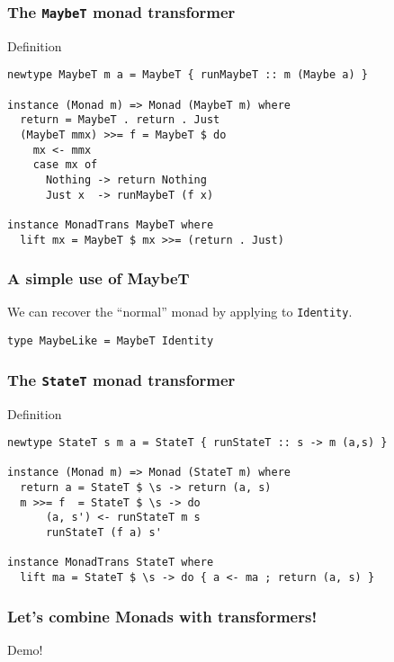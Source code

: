 \documentclass[pdftex,aspectratio=169]{beamer}
\begin{document}
\begin{frame}[fragile]
  \frametitle{The \texttt{MaybeT} monad transformer}
  \begin{block}{Definition}
\begin{lstlisting}
newtype MaybeT m a = MaybeT { runMaybeT :: m (Maybe a) }

instance (Monad m) => Monad (MaybeT m) where
  return = MaybeT . return . Just
  (MaybeT mmx) >>= f = MaybeT $ do
    mx <- mmx
    case mx of
      Nothing -> return Nothing
      Just x  -> runMaybeT (f x)

instance MonadTrans MaybeT where
  lift mx = MaybeT $ mx >>= (return . Just)
\end{lstlisting}
  \end{block}
\end{frame}

\begin{frame}[fragile]
  \frametitle{A simple use of MaybeT}
  We can recover the ``normal'' monad by applying to \lstinline{Identity}.
  \begin{block}{}
  \begin{lstlisting}
type MaybeLike = MaybeT Identity
  \end{lstlisting}
\end{block}
\end{frame}


\begin{frame}[fragile]
  \frametitle{The \texttt{StateT} monad transformer}
  \begin{block}{Definition}
\begin{lstlisting}
newtype StateT s m a = StateT { runStateT :: s -> m (a,s) }

instance (Monad m) => Monad (StateT m) where
  return a = StateT $ \s -> return (a, s)
  m >>= f  = StateT $ \s -> do
      (a, s') <- runStateT m s
      runStateT (f a) s'

instance MonadTrans StateT where
  lift ma = StateT $ \s -> do { a <- ma ; return (a, s) }
\end{lstlisting}
  \end{block}
\end{frame}


\begin{frame}[fragile]
  \frametitle{Let's combine Monads with transformers!}

  Demo!
\end{frame}
\end{document}
